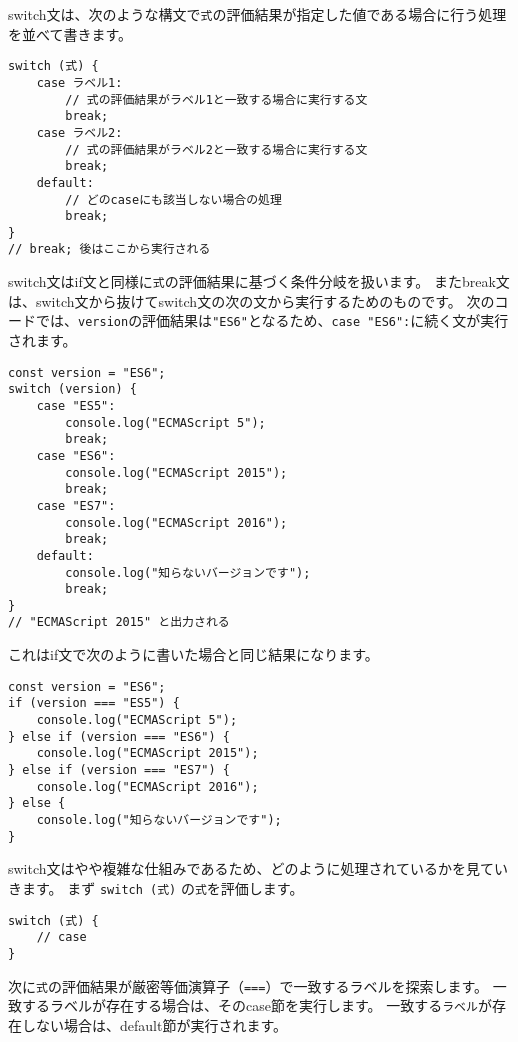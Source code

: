 switch文は、次のような構文で\texttt{式}の評価結果が指定した値である場合に行う処理を並べて書きます。

\begin{lstlisting}
switch (式) {
    case ラベル1:
        // 式の評価結果がラベル1と一致する場合に実行する文
        break;
    case ラベル2:
        // 式の評価結果がラベル2と一致する場合に実行する文
        break;
    default:
        // どのcaseにも該当しない場合の処理
        break;
}
// break; 後はここから実行される
\end{lstlisting}

switch文はif文と同様に\texttt{式}の評価結果に基づく条件分岐を扱います。
またbreak文は、switch文から抜けてswitch文の次の文から実行するためのものです。
次のコードでは、\texttt{version}の評価結果は\texttt{"ES6"}となるため、\texttt{case "ES6":}に続く文が実行されます。

\begin{lstlisting}
const version = "ES6";
switch (version) {
    case "ES5":
        console.log("ECMAScript 5");
        break;
    case "ES6":
        console.log("ECMAScript 2015");
        break;
    case "ES7":
        console.log("ECMAScript 2016");
        break;
    default:
        console.log("知らないバージョンです");
        break;
}
// "ECMAScript 2015" と出力される
\end{lstlisting}

これはif文で次のように書いた場合と同じ結果になります。

\begin{lstlisting}
const version = "ES6";
if (version === "ES5") {
    console.log("ECMAScript 5");
} else if (version === "ES6") {
    console.log("ECMAScript 2015");
} else if (version === "ES7") {
    console.log("ECMAScript 2016");
} else {
    console.log("知らないバージョンです");
}
\end{lstlisting}

switch文はやや複雑な仕組みであるため、どのように処理されているかを見ていきます。
まず \texttt{switch (式)}
の\texttt{式}を評価します。

\begin{lstlisting}
switch (式) {
    // case
}
\end{lstlisting}

次に\texttt{式}の評価結果が厳密等価演算子（\texttt{===}）で一致するラベルを探索します。
一致するラベルが存在する場合は、そのcase節を実行します。
一致する\texttt{ラベル}が存在しない場合は、default節が実行されます。

